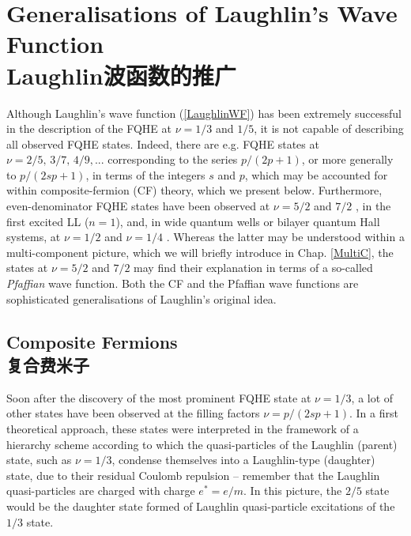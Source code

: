 \documentclass[10pt]{book}
\newcommand{\red}{\color{red}}
\begin{document}
\section[Laughlin波函数的推广]{Generalisations of Laughlin's Wave Function\\\bf Laughlin波函数的推广}
\label{FQHE3}





Although Laughlin's wave function (\ref{LaughlinWF}) has been extremely successful in the description of the FQHE
at $\nu=1/3$ and $1/5$, it is not capable of describing all observed FQHE states. Indeed, there are e.g. FQHE 
states at $\nu=2/5,\,3/7,\,4/9, ...$ corresponding to the series $p/(2p+1)$, or more generally to $p/(2sp+ 1)$, 
in terms of the integers $s$ and $p$,
which may be accounted for within composite-fermion (CF) theory, 
which we present below. Furthermore, even-denominator FQHE states have been 
observed at $\nu=5/2$ and $7/2$ \cite{willett}, 
in the first excited LL ($n=1$), and, in wide quantum wells or bilayer quantum Hall systems,
at $\nu=1/2$ and $\nu=1/4$ \cite{luhmann,shabani}. %
Whereas the latter may be understood within a multi-component picture, which we will briefly
introduce in Chap. \ref{MultiC}, the states at $\nu=5/2$ and $7/2$ may find their explanation in terms of a so-called
{\sl Pfaffian} wave function. Both the CF and the Pfaffian wave functions are sophisticated generalisations of Laughlin's
original idea.

\subsection[复合费米子]{Composite Fermions\\\bf 复合费米子}
\label{CF}

Soon after the discovery of the most prominent FQHE state at $\nu=1/3$, a lot of other states have been observed at the filling
factors $\nu=p/(2sp+1)$. %
In a first theoretical approach, these states were interpreted in the framework of a hierarchy scheme 
\cite{haldane,halperin} according to which the quasi-particles of the Laughlin (parent) state, such as $\nu=1/3$, condense
themselves into a Laughlin-type (daughter) state, due to their residual Coulomb repulsion -- remember that the Laughlin quasi-particles
are charged with charge $e^*=e/m$. In this picture, the $2/5$ state would be the daughter state formed of Laughlin
quasi-particle excitations of the $1/3$ state.
\end{document}
